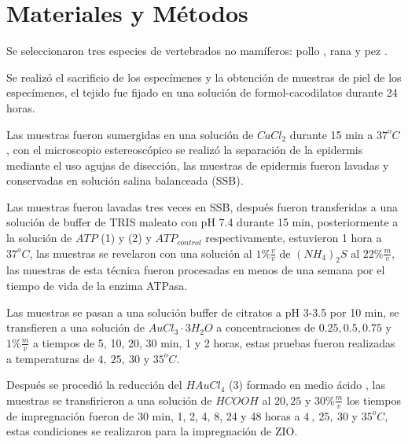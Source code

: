 \section*{Materiales y Métodos}


Se seleccionaron tres especies de vertebrados no mamíferos: pollo , rana  y pez .

Se realizó el sacrificio de los especímenes \cite{web:NOM} y la obtención de muestras de piel de los especímenes, el tejido fue fijado en una solución de formol-cacodilatos durante 24 horas.

Las muestras fueron sumergidas en una solución de $CaCl_{2}$ durante 15 min a $37^oC$ \cite{article:epidermis}, con el microscopio estereoscópico se realizó la separación de la epidermis mediante el uso agujas de disección, las muestras de epidermis fueron lavadas y conservadas en solución salina balanceada (SSB).


Las muestras fueron lavadas tres veces en SSB, después fueron transferidas a una solución de buffer de TRIS maleato con pH 7.4 durante 15 min, posteriormente a la solución de $ATP$ (1) y (2) \cite{article:ATPasaReaction} y $ATP_{control}$ respectivamente, estuvieron 1 hora a $37^oC$, las muestras se revelaron con una solución al $1\%\frac{v}{v}$ de $(NH_{4})_{2}S$ al $22\%\frac{m}{v}$, las muestras de esta técnica fueron procesadas en menos de una semana por el tiempo de vida de la enzima ATPasa.







Las muestras se pasan a una solución buffer de citratos a pH 3-3.5 por 10 min, se transfieren a una solución de $AuCl_{3}\cdot 3H_{2}O$ a concentraciones de $0.25,0.5,0.75$ y $1\% \frac{m}{v}$ a tiempos de 5, 10, 20, 30 min, 1 y 2 horas, estas pruebas fueron realizadas a temperaturas de $4,~25,~30$ y $35^oC$.

Después se procedió la reducción del $HAuCl_{4}$ (3) formado en medio ácido \cite{article:reduccionOro}, las muestras se transfirieron a una solución de $HCOOH$ al $20,25$ y $30\%\frac{m}{v}$ los tiempos de impregnación fueron de 30 min, 1, 2, 4, 8, 24 y 48 horas a $4~,~25,~30$ y $35^oC$, estas condiciones se realizaron para la impregnación de ZIO.

